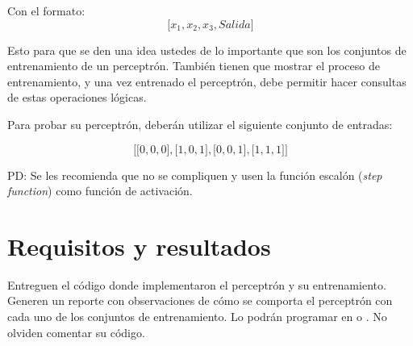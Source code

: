 Con el formato: \[\texttt{[}x_1, x_2, x_3, Salida\texttt{]} \]

\noindent Esto para que se den una idea ustedes de lo importante que son los conjuntos de entrenamiento de un perceptrón.
También tienen que mostrar el proceso de entrenamiento, y una vez entrenado el perceptrón, debe permitir hacer consultas de estas operaciones lógicas.\par
Para probar su perceptrón, deberán utilizar el siguiente conjunto de entradas:

\[\texttt{[}\texttt{[}0,0,0\texttt{]}, \texttt{[}1,0,1\texttt{]}, \texttt{[}0,0,1\texttt{]}, \texttt{[}1,1,1\texttt{]} \texttt{]}\]

\noindent PD: Se les recomienda que no se compliquen y usen la función escalón (\textit{step function}) como función de activación.\par


\section{Requisitos y resultados}

Entreguen el código donde implementaron el perceptrón y su entrenamiento.  Generen un reporte con observaciones de cómo se comporta el perceptrón con cada uno de los conjuntos de entrenamiento. Lo podrán programar en  o . No olviden comentar su código.\medskip





